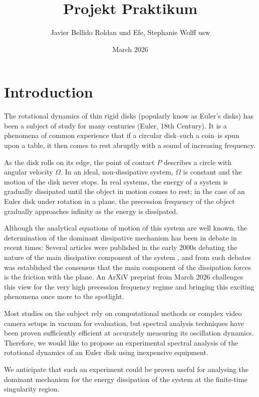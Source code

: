 \documentclass{article}
\title{Projekt Praktikum}
\author{Javier Bellido Roldan und Efe, Stephanie Wolff usw}
\date{March 2026}
\begin{document}
\maketitle

\section{Introduction}
The rotational dynamics of thin rigid disks (popularly know as Euler's disks) has been a subject of study for many centuries (Euler, 18th Century). It is a phenomena of common experience that if a circular disk--such a coin--is spun upon a table, it then comes to rest abruptly with a sound of increasing frequency.

As the disk rolls on its edge, the point of contact $P$ describes a circle with angular velocity $\Omega$. In an ideal, non-dissipative system, $\Omega$ is constant and the motion of the disk never stops. In real systems, the energy of a system is gradually dissipated until the object in motion comes to rest; in the case of an Euler disk under rotation in a plane, the precession frequency of the object gradually approaches infinity as the energy is dissipated. 

Although the analytical equations of motion of this system are well known, the determination of the dominant dissipative mechanism has been in debate in recent times: Several articles were published in the early 2000s \autocite{Moffatt2000} debating the nature of the main dissipative component of the system \autocite{PhysRevE2002, vandenEngh2000, Petrie2002}, and from such debates was established the consensus that the main component of the dissipation forces is the friction with the plane. An ArXiV preprint\autocite{Thorne2026} from March 2026 challenges this view for the very high precession frequency regime and bringing this exciting phenomena once more to the spotlight.

Most studies on the subject rely on computational methods or complex video camera setups in vacuum for evaluation, but spectral analysis techniques have been proven sufficiently efficient at accurately measuring its oscillation dynamics\autocite{Darmendrail2021}. Therefore, we would like to propose an experimental spectral analysis of the rotational dynamics of an Euler disk using inexpensive equipment.

We anticipate that such an experiment could be proven useful for analysing the dominant mechanism for the energy dissipation of the system at the finite-time singularity region.
\end{document}

